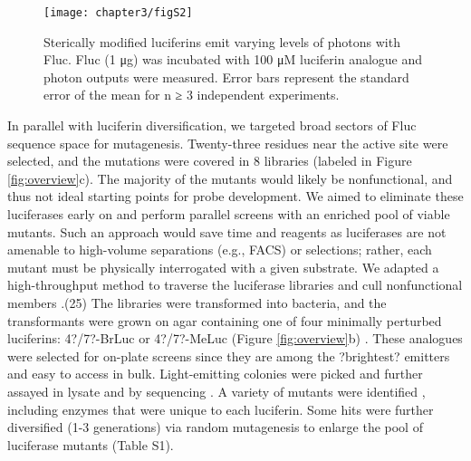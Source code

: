 \begin{figure}[htbp]
\texttt{[image: chapter3/figS2]}
\centering
\caption[Sterically modified luciferins emit varying levels of photons with Fluc]{Sterically modified luciferins emit varying levels of photons with Fluc. Fluc (1 μg) was incubated with 100 μM luciferin analogue and photon outputs were measured. Error bars represent the standard error of the mean for n ≥ 3 independent experiments.}
  \label{fig:S2}
\end{figure}
\par
In parallel with luciferin diversification, we targeted broad sectors of Fluc sequence space for mutagenesis. Twenty-three residues near the active site were selected, and the mutations were covered in 8 libraries (labeled in Figure \ref{fig:overview}c). The majority of the mutants would likely be nonfunctional, and thus not ideal starting points for probe development. We aimed to eliminate these luciferases early on and perform parallel screens with an enriched pool of viable mutants. Such an approach would save time and reagents as luciferases are not amenable to high-volume separations (e.g., FACS) or selections; rather, each mutant must be physically interrogated with a given substrate. We adapted a high-throughput method to traverse the luciferase libraries and cull nonfunctional members
.\cite{Jones:2017be}(25) The libraries were transformed into bacteria, and the transformants were grown on agar containing one of four minimally perturbed luciferins: 4?/7?-BrLuc or 4?/7?-MeLuc (Figure \ref{fig:overview}b)
. These analogues were selected for on-plate screens since they are among the ?brightest? emitters and easy to access in bulk. Light-emitting colonies were picked and further assayed in lysate and by sequencing
. A variety of mutants were identified
, including enzymes that were unique to each luciferin. Some hits were further diversified (1-3 generations) via random mutagenesis to enlarge the pool of luciferase mutants (Table S1). %

